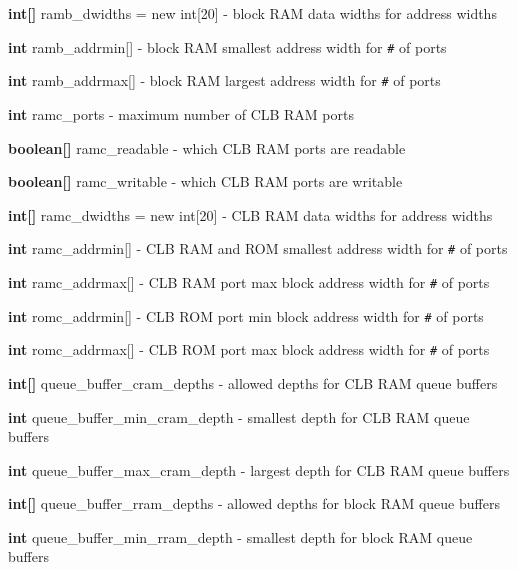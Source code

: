 \item   {\bf int[]} ramb\_dwidths = new int[20] - block RAM data widths for address widths

\item   {\bf int} ramb\_addrmin[] - block RAM smallest address width for \verb'#' of ports

\item   {\bf int} ramb\_addrmax[] - block RAM largest address width for \verb'#' of ports

\item   {\bf int} ramc\_ports - maximum number of CLB RAM ports

\item   {\bf boolean[]} ramc\_readable - which CLB RAM ports are readable

\item   {\bf boolean[]} ramc\_writable - which CLB RAM ports are writable

\item   {\bf int[]} ramc\_dwidths = new int[20] - CLB RAM data widths for address widths

\item   {\bf int} ramc\_addrmin[] - CLB RAM and ROM smallest address width for \verb'#' of ports

\item   {\bf int} ramc\_addrmax[] - CLB RAM port max block address width for \verb'#' of ports

\item   {\bf int} romc\_addrmin[] - CLB ROM port min block address width for \verb'#' of ports

\item   {\bf int} romc\_addrmax[] - CLB ROM port max block address width for \verb'#' of ports

\item   {\bf int[]} queue\_buffer\_cram\_depths - allowed depths for CLB RAM queue buffers

\item   {\bf int} queue\_buffer\_min\_cram\_depth - smallest depth for CLB RAM queue buffers

\item   {\bf int} queue\_buffer\_max\_cram\_depth - largest depth for CLB RAM queue buffers

\item   {\bf int[]} queue\_buffer\_rram\_depths - allowed depths for block RAM queue buffers

\item   {\bf int} queue\_buffer\_min\_rram\_depth - smallest depth for block RAM queue buffers

